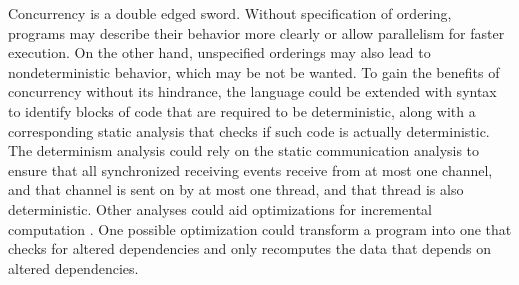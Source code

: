 \documentclass[letterpaper, 11pt]{report}
\begin{document}
Concurrency is a double edged sword. Without specification of ordering, programs may
describe their behavior more clearly or allow parallelism for faster execution. On the other hand,
unspecified orderings may also lead to nondeterministic behavior, which may be not be wanted. 
To gain the benefits of concurrency without its hindrance, the language could be extended
with syntax to identify blocks of code that are required to be deterministic,
along with a corresponding static analysis that checks if such code is actually
deterministic. The determinism analysis could rely on the static communication analysis
to ensure that all synchronized receiving events receive from at most one channel,
and that channel is sent on by at most one thread, and that thread is also deterministic.
Other analyses could aid optimizations for incremental computation
\cite{acar2002adaptive}. One possible optimization could transform a program into one
that checks for altered dependencies and only recomputes the data that depends on altered dependencies.

\newpage



\end{document}
